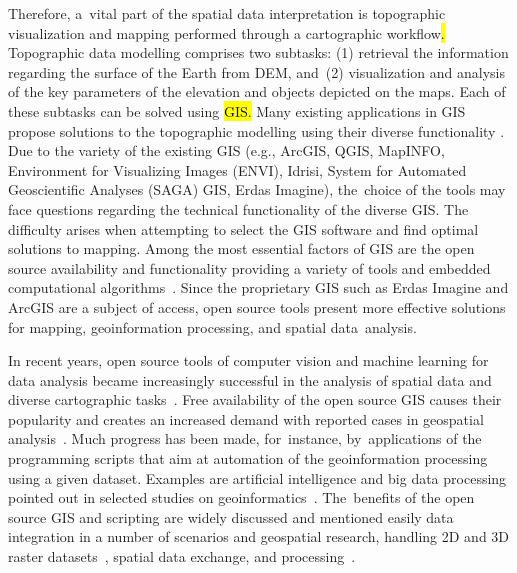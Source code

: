 \documentclass[technologies,article,accept,pdftex,moreauthors]{Definitions/mdpi}
\begin{document}
Therefore, a~vital part of the spatial data interpretation is {topographic }visualization and mapping performed through a cartographic workflow\hl{. }Topographic data modelling comprises two subtasks: (1) retrieval the information regarding the surface of the Earth from DEM, and~(2) visualization and analysis of the key parameters of the elevation and objects depicted on the maps. Each of these subtasks can be solved using \hl{GIS. }Many existing applications in GIS {propose solutions to the topographic modelling using their diverse functionality} \cite{Boulton,Buterez,Duncan}. Due to the variety of the existing GIS (e.g., ArcGIS, QGIS, MapINFO, Environment for Visualizing Images (ENVI), Idrisi, System for Automated Geoscientific Analyses (SAGA) GIS, Erdas Imagine), the~choice of the tools may face{ }questions regarding the {technical} functionality of the {diverse} GIS. {The difficulty arises when attempting to select the GIS software and find optimal solutions to mapping. }Among the most essential factors of GIS are the open source availability and functionality providing a variety of tools and embedded computational algorithms~\cite{agronomy11050952,Armstrong,ijgi5110209}. Since the {proprietary} GIS such as Erdas Imagine and ArcGIS are a subject of access, open source tools present {more }effective solutions for mapping{, geoinformation processing}, and spatial data~analysis. 

In recent years, open source tools of computer vision and machine learning for data analysis became increasingly successful in {the analysis of} spatial data and {diverse }cartographic tasks~\cite{Brovelli}. Free availability of {the }open source GIS {causes their } popularity and {creates} an increased demand with reported cases in{ }geospatial analysis~\cite{Christl,Turton}. Much progress has been made, for~instance, by~applications of {the }programming scripts that aim at {automation of the geoinformation }processing using a given dataset. Examples are artificial intelligence and big data processing pointed out in selected studies on geoinformatics~\cite{Barnes,Issaka}. The~benefits of the open source GIS and scripting are widely discussed and mentioned easily data integration in a number of scenarios and geospatial research, handling 2D and 3D raster datasets~\cite{land12010261}, spatial {data} exchange, and processing~\cite{Ajvazi,Guan,Kralidis}. 
\end{document}

